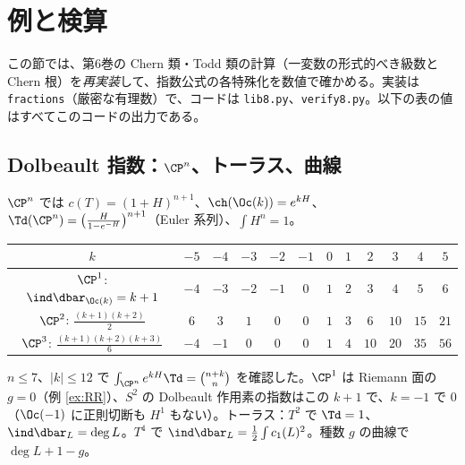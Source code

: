 
\section{例と検算}\label{sec:examples}
この節では、第6巻の Chern 類・Todd 類の計算（一変数の形式的べき級数と Chern 根）を\emph{再実装}して、指数公式の各特殊化を数値で確かめる。実装は \texttt{fractions}（厳密な有理数）で、コードは \texttt{lib8.py}、\texttt{verify8.py}。以下の表の値はすべてこのコードの出力である。

\subsection{Dolbeault 指数：$\CP^n$、トーラス、曲線}
$\CP^n$ では $c(T)=(1+H)^{n+1}$、$\ch(\Oc(k))=e^{kH}$、$\Td(\CP^n)=\bigl(\frac H{1-e^{-H}}\bigr)^{n+1}$（Euler 系列）、$\int H^n=1$。
\begin{center}
{\small\begin{tabular}{c|ccccccccccc}
\toprule
$k$ & $-5$ & $-4$ & $-3$ & $-2$ & $-1$ & $0$ & $1$ & $2$ & $3$ & $4$ & $5$\\
\midrule
$\CP^1$: $\ind\dbar_{\Oc(k)}=k+1$ & $-4$ & $-3$ & $-2$ & $-1$ & $0$ & $1$ & $2$ & $3$ & $4$ & $5$ & $6$\\
$\CP^2$: $\frac{(k+1)(k+2)}2$ & $6$ & $3$ & $1$ & $0$ & $0$ & $1$ & $3$ & $6$ & $10$ & $15$ & $21$\\
$\CP^3$: $\frac{(k+1)(k+2)(k+3)}6$ & $-4$ & $-1$ & $0$ & $0$ & $0$ & $1$ & $4$ & $10$ & $20$ & $35$ & $56$\\
\bottomrule
\end{tabular}}
\end{center}
$n\le7$、$|k|\le12$ で $\int_{\CP^n}e^{kH}\Td=\binom{n+k}n$ を確認した。$\CP^1$ は Riemann 面の $g=0$（例 \ref{ex:RR}）、$S^2$ の Dolbeault 作用素の指数はこの $k+1$ で、$k=-1$ で $0$（$\Oc(-1)$ に正則切断も $H^1$ もない）。トーラス：$T^2$ で $\Td=1$、$\ind\dbar_L=\deg L$。$T^4$ で $\ind\dbar_L=\frac12\int c_1(L)^2$。種数 $g$ の曲線で $\deg L+1-g$。

